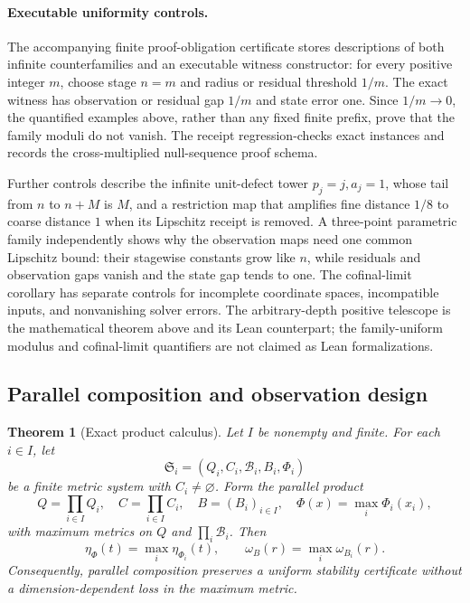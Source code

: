 \documentclass[11pt]{article}
\newtheorem{theorem}{Theorem}[section]
\theoremstyle{definition}
\theoremstyle{remark}
\numberwithin{equation}{section}
\newcommand{\cB}{\mathcal B}
\begin{document}
\paragraph{Executable uniformity controls.}
The accompanying finite proof-obligation certificate stores descriptions of
both infinite counterfamilies and an executable witness
constructor: for every positive integer \(m\), choose stage \(n=m\) and
radius or residual threshold \(1/m\).  The exact witness has observation or
residual gap \(1/m\) and state error one.  Since \(1/m\to0\), the quantified
examples above, rather than any fixed finite prefix, prove that the family
moduli do not vanish.  The receipt regression-checks exact instances and
records the cross-multiplied null-sequence proof schema.

Further controls describe the infinite unit-defect tower
\(p_j=j,a_j=1\), whose tail from \(n\) to \(n+M\) is \(M\), and a restriction
map that amplifies fine distance \(1/8\) to coarse distance \(1\) when its
Lipschitz receipt is removed. A three-point parametric family independently
shows why the observation maps need one common Lipschitz bound: their
stagewise constants grow like \(n\), while residuals and observation gaps
vanish and the state gap tends to one. The cofinal-limit corollary has separate
controls for incomplete coordinate spaces, incompatible inputs, and
nonvanishing solver errors.  The arbitrary-depth positive telescope is the
mathematical theorem above and its Lean counterpart; the family-uniform
modulus and cofinal-limit quantifiers are not claimed as Lean formalizations.

\subsection{Parallel composition and observation design}

\begin{theorem}[Exact product calculus]\label{thm:product-calculus}
Let $I$ be nonempty and finite.  For each $i\in I$, let
\[
 \mathfrak S_i=(Q_i,C_i,\cB_i,B_i,\Phi_i)
\]
be a finite metric system with $C_i\ne\varnothing$.  Form the parallel product
\[
 Q=\prod_{i\in I}Q_i,
 \quad C=\prod_{i\in I}C_i,
 \quad B=(B_i)_{i\in I},
 \quad \Phi(x)=\max_i\Phi_i(x_i),
\]
with maximum metrics on $Q$ and $\prod_i\cB_i$.  Then
\[
 \eta_\Phi(t)=\max_i\eta_{\Phi_i}(t),
 \qquad
 \omega_B(r)=\max_i\omega_{B_i}(r).
\]
Consequently, parallel composition preserves a uniform stability certificate without a dimension-dependent loss in the maximum metric.
\end{theorem}
\end{document}
